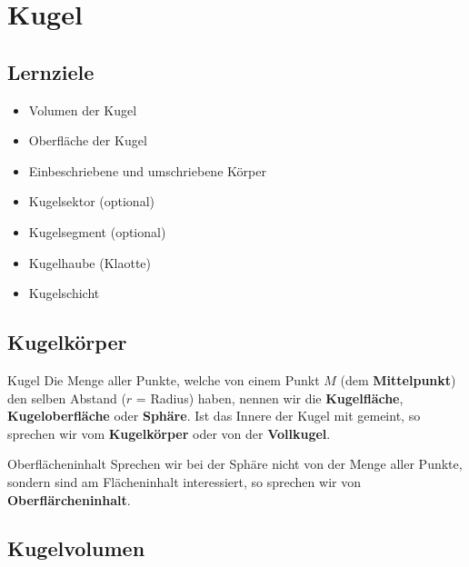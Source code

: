 \section{Kugel}


\subsection*{Lernziele}
\begin{itemize}
\item Volumen der Kugel
\item Oberfläche der Kugel
\item Einbeschriebene und umschriebene Körper
\item Kugelsektor (optional)
\item Kugelsegment (optional)
\item Kugelhaube (Klaotte)
\item Kugelschicht
\end{itemize}
\newpage

\subsection{Kugelkörper}


\begin{definition}{Kugel}{}
  Die Menge aller Punkte, welche von einem Punkt $M$ (dem \textbf{Mittelpunkt}) den selben Abstand ($r$ = Radius) haben, nennen wir die \textbf{Kugelfläche}, \textbf{Kugeloberfläche} oder \textbf{Sphäre}.
  Ist das Innere der Kugel mit gemeint, so sprechen wir vom \textbf{Kugelkörper} oder von der \textbf{Vollkugel}.
\end{definition}

\begin{bemerkung}{Oberflächeninhalt}{}
  Sprechen wir bei der Sphäre nicht von der Menge aller Punkte,
  sondern sind am Flächeninhalt interessiert, so sprechen wir von \textbf{Oberflärcheninhalt}.
  \end{bemerkung}
\newpage

\subsection{Kugelvolumen}


